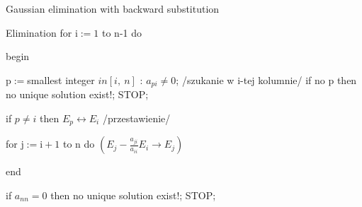 \begin{frame}{Gaussian elimination with backward substitution}

\begin{exampleblock}{Elimination}
for $\mathrm{i}:=1$ to n-1 do

\hspace{4mm} begin

\hspace{7mm} $\mathrm{p}:=$smallest integer $in[i,\ n]$ : $a_{pi}\neq 0$; /szukanie w i-tej 
\hspace*{7mm} kolumnie/ \newline
\hspace*{7mm} if no $\mathrm{p}$ then no unique solution exist!; STOP;

\hspace{7mm} if $p\neq i$ then $E_{p}\leftrightarrow E_{i}$ /przestawienie/

\hspace{7mm} for $\mathrm{j}:=\mathrm{i}+1$ to $\mathrm{n}$ do $(E_{j}-\displaystyle \frac{a_{ji}}{a_{ii}}E_i\rightarrow E_{j})$

\hspace{4mm} end

if $a_{nn}=0$ then no unique solution exist!; STOP;
    	\end{exampleblock}

\end{frame}

